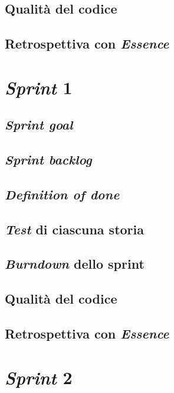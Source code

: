 \documentclass{article}
\begin{document}
\subsection{Qualità del codice}

\subsection{Retrospettiva con \emph{Essence}}

\section{\emph{Sprint} 1}

\subsection{\emph{Sprint goal}}

\subsection{\emph{Sprint backlog}}

\subsection{\emph{Definition of done}}

\subsection{\emph{Test} di ciascuna storia}

\subsection{\emph{Burndown} dello sprint}

\subsection{Qualità del codice}

\subsection{Retrospettiva con \emph{Essence}}

\section{\emph{Sprint} 2}
\end{document}
